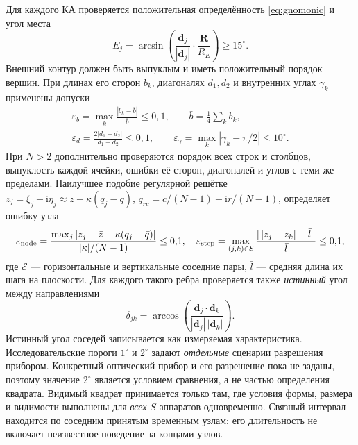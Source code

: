 \documentclass[a4paper,12pt]{article}
\begin{document}
Для каждого КА проверяется положительная определённость
\eqref{eq:gnomonic} и угол места
\begin{equation}
 E_j=\arcsin\!\left(
 \frac{\mathbf d_j}{|\mathbf d_j|}\cdot\frac{\mathbf R}{R_E}
 \right)\geq15^\circ.
 \label{eq:elevation}
\end{equation}
Внешний контур должен быть выпуклым и иметь положительный порядок
вершин. При длинах его сторон $b_k$, диагоналях $d_1,d_2$ и
внутренних углах $\gamma_k$ применены допуски
\begin{equation}
\begin{gathered}
 \varepsilon_b=\max_k\frac{|b_k-\bar b|}{\bar b}\leq0{,}1,
 \qquad \bar b=\frac14\sum_kb_k,\\
 \varepsilon_d=\frac{2|d_1-d_2|}{d_1+d_2}\leq0{,}1,
 \qquad
 \varepsilon_\gamma=\max_k|\gamma_k-\pi/2|\leq10^\circ.
\end{gathered}
 \label{eq:shape}
\end{equation}
При $N>2$ дополнительно проверяются порядок всех строк и столбцов,
выпуклость каждой ячейки, ошибки её сторон, диагоналей и углов с
теми же пределами. Наилучшее подобие регулярной решётке
$z_j=\xi_j+\mathrm i\eta_j\approx\bar z+\kappa(q_j-\bar q)$,
$q_{rc}=c/(N-1)+\mathrm i r/(N-1)$, определяет ошибку узла
\begin{equation}
 \varepsilon_{\rm node}=
 \frac{\max_j|z_j-\bar z-\kappa(q_j-\bar q)|}{|\kappa|/(N-1)}
 \leq0{,}1,
 \quad
 \varepsilon_{\rm step}=
 \max_{(j,k)\in\mathcal E}
 \frac{|\,|z_j-z_k|-\bar l\,|}{\bar l}\leq0{,}1,
 \label{eq:grid}
\end{equation}
где $\mathcal E$ --- горизонтальные и вертикальные соседние пары,
$\bar l$ --- средняя длина их шага на плоскости. Для каждого такого
ребра проверяется также \emph{истинный} угол между направлениями
\begin{equation}
 \delta_{jk}=\arccos\!\left(
 \frac{\mathbf d_j\cdot\mathbf d_k}
 {|\mathbf d_j|\,|\mathbf d_k|}\right).
 \label{eq:neighbor}
\end{equation}
Истинный угол соседей записывается как измеряемая характеристика.
Исследовательские пороги $1^\circ$ и $2^\circ$ задают \emph{отдельные}
сценарии разрешения прибором. Конкретный оптический прибор и его
разрешение пока не заданы, поэтому значение $2^\circ$ является
условием сравнения, а не частью определения квадрата.
Видимый квадрат принимается только там,
где условия формы, размера и видимости выполнены для \emph{всех}
$S$ аппаратов одновременно.
Связный интервал находится по соседним принятым временным узлам;
его длительность не включает неизвестное поведение за концами узлов.
\end{document}
